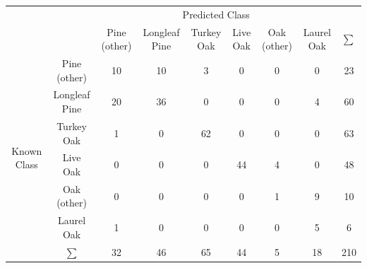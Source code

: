 \documentclass[remotesensing,article,accept,moreauthors,pdftex,12pt,a4paper]{mdpi}
\begin{document}
\begin{table}[t]
\begin{center}
{\begin{tabular}{lllllllll|}
& & \multicolumn{6}{c}{Predicted Class}                                                                         \\  \cline{3-9}  
                                                                                &                                         & \multicolumn{1}{|c|}{Pine (other)} & \multicolumn{1}{c|}{Longleaf Pine} & \multicolumn{1}{c|}{Turkey Oak} & \multicolumn{1}{c|}{Live Oak} & \multicolumn{1}{c|}{Oak (other)} & \multicolumn{1}{c|}{Laurel Oak} & $\mathbf{\sum}$\\  \cline{2-9} 
\multicolumn{1}{c|}{\multirow{7}{*}{\begin{sideways}Known Class\end{sideways}}} & \multicolumn{1}{c|}{Pine (other)}       & \multicolumn{1}{c|}{10}   & \multicolumn{1}{c|}{10} & \multicolumn{1}{c|}{3}  & \multicolumn{1}{c|}{0}  & \multicolumn{1}{c|}{0} & \multicolumn{1}{c|}{0} & \multicolumn{1}{c|}{23} \\ \cline{2-9}  
\multicolumn{1}{c|}{}                                                           & \multicolumn{1}{c|}{Longleaf Pine}      & \multicolumn{1}{c|}{20}   & \multicolumn{1}{c|}{36} & \multicolumn{1}{c|}{0}  & \multicolumn{1}{c|}{0}  & \multicolumn{1}{c|}{0} & \multicolumn{1}{c|}{4} & \multicolumn{1}{c|}{60}\\ \cline{2-9}  
\multicolumn{1}{c|}{}                                                           & \multicolumn{1}{c|}{Turkey Oak}         & \multicolumn{1}{c|}{1}    & \multicolumn{1}{c|}{0}  & \multicolumn{1}{c|}{62} & \multicolumn{1}{c|}{0}  & \multicolumn{1}{c|}{0} & \multicolumn{1}{c|}{0} & \multicolumn{1}{c|}{63}\\ \cline{2-9} 
\multicolumn{1}{c|}{}                                                           & \multicolumn{1}{c|}{Live Oak}           & \multicolumn{1}{c|}{0}    & \multicolumn{1}{c|}{0}  & \multicolumn{1}{c|}{0}  & \multicolumn{1}{c|}{44} & \multicolumn{1}{c|}{4} & \multicolumn{1}{c|}{0} & \multicolumn{1}{c|}{48}\\ \cline{2-9} 
\multicolumn{1}{c|}{}                                                           & \multicolumn{1}{c|}{Oak (other)}        & \multicolumn{1}{c|}{0}    & \multicolumn{1}{c|}{0}  & \multicolumn{1}{c|}{0}  & \multicolumn{1}{c|}{0}  & \multicolumn{1}{c|}{1} & \multicolumn{1}{c|}{9} & \multicolumn{1}{c|}{10}\\ \cline{2-9} 
\multicolumn{1}{c|}{}                                                           & \multicolumn{1}{c|}{Laurel Oak}         & \multicolumn{1}{c|}{1}    & \multicolumn{1}{c|}{0}  & \multicolumn{1}{c|}{0}  & \multicolumn{1}{c|}{0}  & \multicolumn{1}{c|}{0} & \multicolumn{1}{c|}{5} &  \multicolumn{1}{c|}{6}\\ \cline{2-9} 
\multicolumn{1}{c|}{}                                                           & \multicolumn{1}{c|}{$\mathbf{\sum}$}    & \multicolumn{1}{c|}{32}    & \multicolumn{1}{c|}{46}  & \multicolumn{1}{c|}{65}  & \multicolumn{1}{c|}{44}  & \multicolumn{1}{c|}{5} & \multicolumn{1}{c|}{18} &  \multicolumn{1}{c|}{210}\\ \cline{2-9} 



\end{tabular}}
\end{center}
\end{table}
\end{document}
